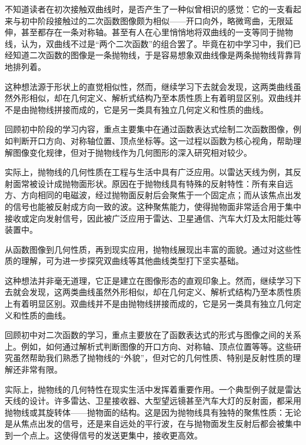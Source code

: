 
\begin{issues}
\issueDraft
\end{issues}


不知道读者在初次接触双曲线时，是否产生了一种似曾相识的感觉：它的一支看起来与初中阶段接触过的二次函数图像颇为相似——开口向外，略微弯曲，无限延伸，甚至都存在一条对称轴。甚至有人在心里悄悄地将双曲线的一支等同于抛物线，认为，双曲线不过是“两个二次函数”的组合罢了。毕竟在初中学习中，我们已经知道二次函数的图像是一条抛物线，于是容易想象双曲线像是两条抛物线背靠背地排列着。

这种想法源于形状上的直觉相似性，然而，继续学习下去就会发现，这两类曲线虽然外形相似，却在几何定义、解析式结构乃至本质性质上有着明显区别。双曲线并不是由抛物线拼接而成的，它是另一类具有独立几何定义和性质的曲线。

回顾初中阶段的学习内容，重点主要集中在通过函数表达式绘制二次函数图像，例如判断开口方向、对称轴位置、顶点坐标等。这一过程以函数为核心视角，帮助理解图像变化规律，但对于抛物线作为几何图形的深入研究相对较少。

实际上，抛物线的几何性质在工程与生活中具有广泛应用。以雷达天线为例，其反射面常被设计成抛物面形状。原因在于抛物线具有特殊的反射特性：所有来自远方、方向相同的电磁波，经过抛物面反射后会聚焦于一个固定点；而从该焦点出发的信号也能被反射成方向一致的波。这种聚焦能力，使得抛物面非常适合用于集中接收或定向发射信号，因此被广泛应用于雷达、卫星通信、汽车大灯及太阳能灶等装置中。

从函数图像到几何性质，再到现实应用，抛物线展现出丰富的面貌。通过对这些性质的理解，可为进一步探究双曲线等其他曲线类型打下坚实基础。

这种想法并非毫无道理，它正是建立在图像形态的直观印象上。然而，继续学习下去就会发现，这两类曲线虽然外形相似，却在几何定义、解析式结构乃至本质性质上有着明显区别。双曲线并不是由抛物线拼接而成的，它是另一类具有独立几何定义和性质的曲线。

回顾初中对二次函数的学习，重点主要放在了函数表达式的形式与图像之间的关系上。例如，如何通过解析式判断图像的开口方向、对称轴、顶点位置等等。这些研究虽然帮助我们熟悉了抛物线的“外貌”，但对它的几何性质、特别是反射性质的理解还非常有限。

实际上，抛物线的几何特性在现实生活中发挥着重要作用。一个典型例子就是雷达天线的设计。许多雷达、卫星接收器、大型望远镜甚至汽车大灯的反射面，都采用抛物线或其旋转体——抛物面的结构。这是因为抛物线具有独特的聚焦性质：无论是从焦点出发的信号，还是来自远处的平行波，在与抛物面发生反射后都会被集中到一个点上。这使得信号的发送更集中，接收更高效。

